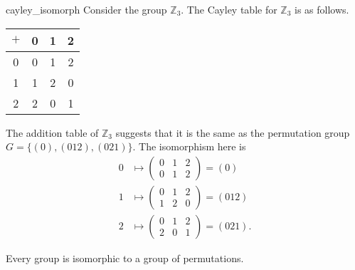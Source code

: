 \begin{example}{cayley_isomorph}
Consider the group ${\mathbb Z}_3$.  The Cayley table for ${\mathbb Z}_3$ is as follows. 
\begin{center}
\begin{tabular}{c|ccc}
$+$   & 0 & 1 & 2 \\
\hline
0     & 0 & 1 & 2 \\
1     & 1 & 2 & 0 \\
2     & 2 & 0 & 1
\end{tabular}
\end{center}
The addition table of ${\mathbb Z}_3$ suggests that it is the same as the permutation group $G = \{ (0), (0 1 2), (0 2 1) \}$.  The isomorphism here is 
\begin{align*}
0 & \mapsto
\begin{pmatrix}
0 & 1 & 2 \\
0 & 1 & 2
\end{pmatrix}
= (0) \\
1 & \mapsto
\begin{pmatrix}
0 & 1 & 2 \\
1 & 2 & 0
\end{pmatrix}
= (0 1 2) \\
2 & \mapsto
\begin{pmatrix}
0 & 1 & 2 \\
2 & 0 & 1
\end{pmatrix}
= (0 2 1).
\end{align*}
\end{example}
 
\begin{theorem}[Cayley]\label{isomorph_theorem_6}
Every group is isomorphic to a group of permutations.
\end{theorem}


